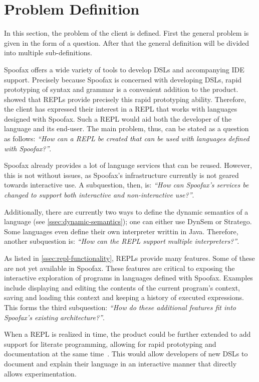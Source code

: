 \section{Problem Definition}
\label{sec:problem-definition}

In this section, the problem of the client is defined. First the
general problem is given in the form of a question. After that the
general definition will be divided into multiple sub-definitions.

Spoofax offers a wide variety of tools to develop DSLs and accompanying IDE
support. Precisely because Spoofax is concerned with developing DSLs, rapid
prototyping of syntax and grammar is a convenient addition to the product.
 showed that REPLs provide precisely this rapid prototyping
ability.  Therefore, the client has expressed their interest in a REPL that
works with languages designed with Spoofax. Such a REPL would aid both the
developer of the language and its end-user. The main problem, thus, can be
stated as a question as follows: \textit{``How can a REPL be created that can be
used with languages defined with Spoofax?''}.

Spoofax already provides a lot of language services that can be reused. However,
this is not without issues, as Spoofax's infrastructure currently is not geared
towards interactive use. A subquestion, then, is: \textit{``How can Spoofax's
services be changed to support both interactive and non-interactive use?''}.

Additionally, there are currently two ways to define the dynamic semantics of a
language (see \cref{ssec:dynamic-semantics}); one can either use DynSem or Stratego.
Some languages even define their own interpreter writtin in Java. Therefore,
another subquestion is: \textit{``How can the REPL support multiple
interpreters?''}.

As listed in \cref{ssec:repl-functionality}, REPLs provide many features. Some
of these are not yet available in Spoofax. These features are critical to
exposing the interactive exploration of programs in languages defined with
Spoofax. Examples include displaying and editing the contents of the current
program's context, saving and loading this context and keeping a history of
executed expressions. This forms the third subquestion: \textit{``How do these
additional features fit into Spoofax's existing architecture?''}.

When a REPL is realized in time, the product could be further extended to add
support for literate programming, allowing for rapid prototyping and
documentation at the same time~\cite{schulte2012}. This would allow
developers of new DSLs to document and explain their language in an
interactive manner that directly allows experimentation.

